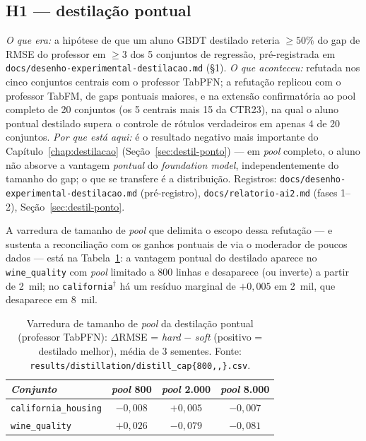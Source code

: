 \subsection{H1 --- destilação pontual}
\emph{O que era:} a hipótese de que um aluno
GBDT destilado reteria $\geq 50\%$ do gap de RMSE do professor em
$\geq 3$ dos 5 conjuntos de regressão, pré-registrada em
\texttt{docs/\allowbreak desenho-\allowbreak experimental-\allowbreak destilacao.\allowbreak md} (\S1). \emph{O que aconteceu:}
refutada nos cinco conjuntos centrais com o professor TabPFN; a
refutação replicou com o professor TabFM, de gaps pontuais maiores, e
na extensão confirmatória ao pool completo de 20 conjuntos (os 5
centrais mais 15 da CTR23), na
qual o aluno
pontual destilado supera o controle de rótulos verdadeiros em apenas
4 de 20 conjuntos.
\emph{Por que está aqui:} é o resultado negativo mais importante do
Capítulo~\ref{chap:destilacao} (Seção~\ref{sec:destil-ponto}) --- em
\emph{pool} completo, o aluno não absorve a vantagem \emph{pontual} do
\emph{foundation model}, independentemente do tamanho do gap; o que
se transfere é a distribuição. Registros:
\texttt{docs/\allowbreak desenho-\allowbreak experimental-\allowbreak destilacao.\allowbreak md} (pré-registro),
\texttt{docs/\allowbreak relatorio-\allowbreak ai2.\allowbreak md} (fases 1--2),
Seção~\ref{sec:destil-ponto}.

A varredura de tamanho de \emph{pool} que delimita o escopo dessa refutação ---
e sustenta a reconciliação com os ganhos pontuais de
\citet{jeong2026} via o moderador de poucos dados --- está na
Tabela~\ref{tab:app-cap-sweep}: a vantagem pontual do destilado
aparece no \texttt{wine\_quality} com \emph{pool} limitado a 800
linhas e desaparece (ou inverte) a partir de 2~mil; no
\texttt{california}$^\dagger$ há um resíduo marginal de $+0{,}005$
em 2~mil, que desaparece em 8~mil.

\begin{table}[htb]
\centering
\small
\caption[Varredura de tamanho de \emph{pool} (destilação pontual)]{Varredura de tamanho de \emph{pool} da destilação pontual
(professor TabPFN): $\Delta$RMSE = \emph{hard} $-$ \emph{soft}
(positivo = destilado melhor), média de 3 sementes. Fonte:
\texttt{results/\allowbreak distillation/\allowbreak distill\_\allowbreak cap\{800,,\}.\allowbreak csv}.}
\label{tab:app-cap-sweep}
\begin{tabular}{lccc}
\toprule
\emph{Conjunto} & \emph{pool} 800 & \emph{pool} 2.000 & \emph{pool} 8.000 \\
\midrule
\texttt{california\_\allowbreak housing} & $-0{,}008$ & $+0{,}005$ & $-0{,}007$ \\
\texttt{wine\_quality}       & $+0{,}026$ & $-0{,}079$ & $-0{,}081$ \\
\bottomrule
\end{tabular}
\end{table}

